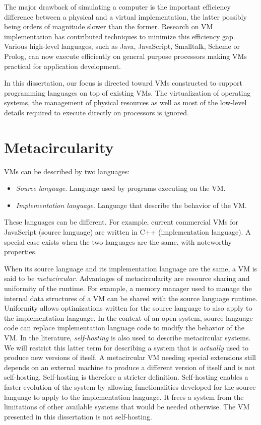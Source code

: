 The major drawback of simulating a computer is the important efficiency
difference between a physical and a virtual implementation, the latter possibly
being orders of magnitude slower than the former. Research on VM
implementation has contributed techniques to minimize this efficiency gap.
Various high-level languages, such as Java, JavaScript, Smalltalk, Scheme or
Prolog, can now execute efficiently on general purpose processors making VMs
practical for application development.

In this dissertation, our focus is directed toward VMs constructed to
support programming languages on top of existing VMs. The virtualization of
operating systems, the management of physical resources as well as most of the
low-level details required to execute directly on processors is ignored.

\section{Metacircularity}

VMs can be described by two languages:
\begin{itemize}
    \item \textit{Source language}. Language used by programs executing on the
        VM.
    \item \textit{Implementation language}. Language that describe the behavior
        of the VM.
\end{itemize}
These languages can be different. For example, current commercial VMs for
JavaScript (source language) are written in C++ (implementation language).  A
special case exists when the two languages are the same, with noteworthy
properties.

When its source language and its implementation language are the same, a VM is
said to be \textit{metacircular}. Advantages of metacircularity are resource
sharing and uniformity of the runtime. For example, a memory manager used to
manage the internal data structures of a VM can be shared with the source
language runtime. Uniformity allows optimizations written for the source
language to also apply to the implementation language. In the context of an
open system, source language code can replace implementation language code to
modify the behavior of the VM. In the literature, \textit{self-hosting} is also
used to describe metacircular systems. We will restrict this latter term for
describing a system that is \textit{actually} used to produce new versions of
itself.  A metacircular VM needing special extensions still depends on an
external machine to produce a different version of itself and is not
self-hosting.  Self-hosting is therefore a stricter definition.  Self-hosting
enables a faster evolution of the system by allowing functionalities developed
for the source language to apply to the implementation language. It frees a
system from the limitations of other available systems that would be needed
otherwise. The VM presented in this dissertation is not self-hosting.

